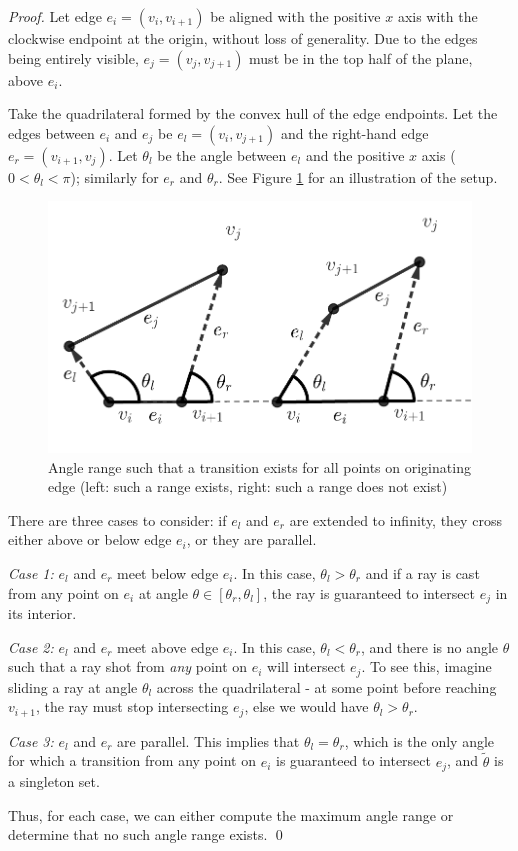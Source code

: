 \documentclass[sageh,times,Review]{sagej}
\begin{document}
\begin{proof}

Let edge $e_i = (v_i, v_{i+1})$ be aligned with the positive $x$ axis with the clockwise
endpoint at the origin, without loss of generality. 
Due to the edges being
entirely visible, $e_j = (v_j, v_{j+1})$ must be in the top half of the plane, above
$e_i$.

Take the quadrilateral formed by the convex hull of the edge endpoints.
Let the edges between $e_i$ and $e_j$ be $e_l = (v_i, v_{j+1})$ and the right-hand edge 
$e_r = (v_{i+1}, v_j)$. Let $\theta_{l}$ be
the angle between $e_l$ and the positive $x$ axis ($0 < \theta_l < \pi$); similarly
for $e_r$ and $\theta_r$. See Figure \ref{fig:bounce_range} for an illustration of
the setup. 

\begin{figure}
    \centering
    \includegraphics[width=0.8\columnwidth]{bouncerange_min.pdf}
    \caption{Angle range such that a transition exists for all points on
originating edge (left: such a range exists, right: such a range does not
exist)}
\label{fig:bounce_range}
\end{figure}


There are three cases to consider: if $e_l$ and $e_r$ are extended to infinity,
they cross either above or below edge $e_i$, or they are parallel.

\emph{Case 1:} $e_l$ and $e_r$ meet below edge $e_i$. In this case,
$\theta_l > \theta_r$ and if a ray is cast from any point on $e_i$ at angle
$\theta \in [\theta_r, \theta_l]$, the ray is guaranteed to intersect $e_j$ in its
interior.

\emph{Case 2:} $e_l$ and $e_r$ meet above edge $e_i$. In this case, $\theta_l <
\theta_r$, and there is no angle
$\theta$ such that a ray shot from \emph{any} point on $e_i$ will intersect
$e_j$.
To see this, imagine sliding a ray at angle $\theta_l$ across the quadrilateral
- at some point before reaching $v_{i+1}$, the ray must stop intersecting $e_j$,
else we would have $\theta_l > \theta_r$.

\emph{Case 3:} $e_l$ and $e_r$ are parallel. This implies that $\theta_{l} =
\theta_{r}$, which is the only angle for which a transition from any
point on $e_i$ is guaranteed to intersect $e_j$, and $\tilde{\theta}$ is a
singleton set.

Thus, for each case, we can either compute the maximum angle range or determine
that no such angle range exists. \qed

\end{proof}
\end{document}
